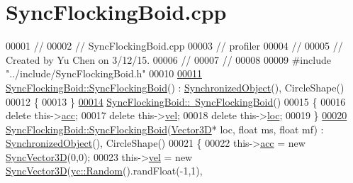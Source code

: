 \hypertarget{_sync_flocking_boid_8cpp_source}{}\section{Sync\+Flocking\+Boid.\+cpp}
\label{_sync_flocking_boid_8cpp_source}

\begin{DoxyCode}
00001 \textcolor{comment}{//}
00002 \textcolor{comment}{//  SyncFlockingBoid.cpp}
00003 \textcolor{comment}{//  profiler}
00004 \textcolor{comment}{//}
00005 \textcolor{comment}{//  Created by Yu Chen on 3/12/15.}
00006 \textcolor{comment}{//}
00007 \textcolor{comment}{//}
00008 
00009 \textcolor{preprocessor}{#include "../include/SyncFlockingBoid.h"}
00010 
\hypertarget{_sync_flocking_boid_8cpp_source_l00011}{}\hyperlink{class_sync_flocking_boid_a76ceab54bd8eec11f04c11f557f24100}{00011} \hyperlink{class_sync_flocking_boid_a76ceab54bd8eec11f04c11f557f24100}{SyncFlockingBoid::SyncFlockingBoid}() : 
      \hyperlink{namespacedsf_acbf1798fc56cfb1707162a17e13f5fda}{SynchronizedObject}(), CircleShape()
00012 \{
00013 \}
\hypertarget{_sync_flocking_boid_8cpp_source_l00014}{}\hyperlink{class_sync_flocking_boid_a2a7c4d7467f92cd223b1ab5290be9f05}{00014} \hyperlink{class_sync_flocking_boid_a2a7c4d7467f92cd223b1ab5290be9f05}{SyncFlockingBoid::~SyncFlockingBoid}()
00015 \{
00016     \textcolor{keyword}{delete} this->\hyperlink{class_sync_flocking_boid_ac3bd9015e70a26d8a59d200563a5cf0e}{acc};
00017     \textcolor{keyword}{delete} this->\hyperlink{class_sync_flocking_boid_a1b6cf043598e64ecd40ecd5b75beb01f}{vel};
00018     \textcolor{keyword}{delete} this->\hyperlink{class_sync_flocking_boid_a1448999018acaa4ec3117ee2bbee2b02}{loc};
00019 \}
\hypertarget{_sync_flocking_boid_8cpp_source_l00020}{}\hyperlink{class_sync_flocking_boid_ac136f832c43c76135ad2cd80e549320f}{00020} \hyperlink{class_sync_flocking_boid_a76ceab54bd8eec11f04c11f557f24100}{SyncFlockingBoid::SyncFlockingBoid}(\hyperlink{class_vector3_d}{Vector3D}* loc, \textcolor{keywordtype}{float} ms, \textcolor{keywordtype}{float}
       mf) : \hyperlink{namespacedsf_acbf1798fc56cfb1707162a17e13f5fda}{SynchronizedObject}(), CircleShape()
00021 \{
00022     this->\hyperlink{class_sync_flocking_boid_ac3bd9015e70a26d8a59d200563a5cf0e}{acc} = \textcolor{keyword}{new} \hyperlink{class_sync_vector3_d}{SyncVector3D}(0,0);
00023     this->\hyperlink{class_sync_flocking_boid_a1b6cf043598e64ecd40ecd5b75beb01f}{vel} = \textcolor{keyword}{new} \hyperlink{class_sync_vector3_d}{SyncVector3D}(\hyperlink{classyc_1_1_random}{yc::Random}().randFloat(-1,1), 

\end{DoxyCode}

